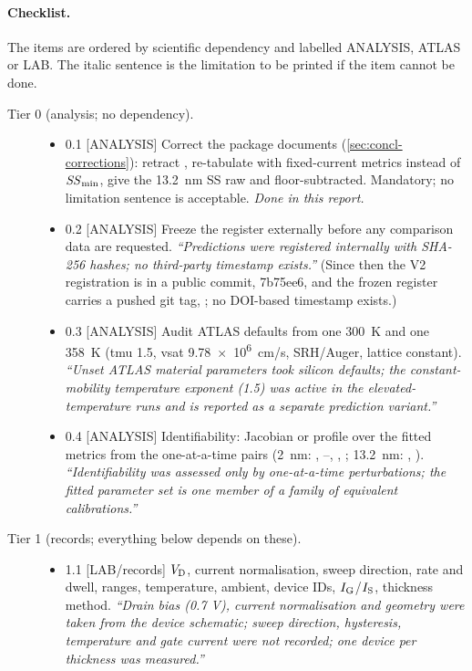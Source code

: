 \paragraph{Checklist.} The items are ordered by scientific dependency and labelled ANALYSIS, ATLAS or LAB. The italic sentence is the limitation to be printed if the item cannot be done.

\begin{description}
  \item[Tier 0 (analysis; no dependency).]
  \begin{itemize}
    \item 0.1 [ANALYSIS] Correct the package documents (\cref{sec:concl-corrections}): retract , re-tabulate with fixed-current metrics instead of $\mathit{SS}_{\min}$, give the 13.2~nm SS raw and floor-subtracted. Mandatory; no limitation sentence is acceptable. \emph{Done in this report.}
    \item 0.2 [ANALYSIS] Freeze the register externally before any comparison data are requested. \emph{``Predictions were registered internally with SHA-256 hashes; no third-party timestamp exists.''} (Since then the V2 registration is in a public commit, 7b75ee6, and the frozen register carries a pushed git tag, ; no DOI-based timestamp exists.)
    \item 0.3 [ANALYSIS] Audit ATLAS defaults from one 300~K and one 358~K  (tmu 1.5, vsat \SI{9.78e6}{cm/s}, SRH/Auger, lattice constant). \emph{``Unset ATLAS material parameters took silicon defaults; the constant-mobility temperature exponent (1.5) was active in the elevated-temperature runs and is reported as a separate prediction variant.''}
    \item 0.4 [ANALYSIS] Identifiability: Jacobian or profile over the fitted metrics from the one-at-a-time pairs (2~nm: , --, , ; 13.2~nm: , ). \emph{``Identifiability was assessed only by one-at-a-time perturbations; the fitted parameter set is one member of a family of equivalent calibrations.''}
  \end{itemize}
  \item[Tier 1 (records; everything below depends on these).]
  \begin{itemize}
    \item 1.1 [LAB/records] $V_{\mathrm{D}}$, current normalisation, sweep direction, rate and dwell, ranges, temperature, ambient, device IDs, $I_{\mathrm{G}}$/$I_{\mathrm{S}}$, thickness method. \emph{``Drain bias (0.7 V), current normalisation and geometry were taken from the device schematic; sweep direction, hysteresis, temperature and gate current were not recorded; one device per thickness was measured.''}

\end{itemize}
\end{description}
